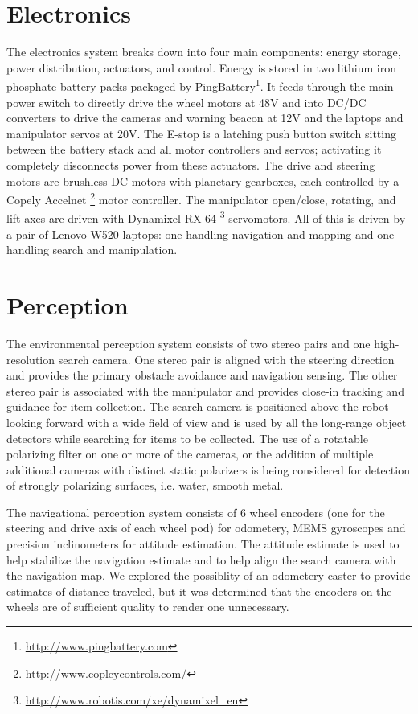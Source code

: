 \documentclass[12pt]{article}
\begin{document}
\section{Electronics}\label{Electronics}

The electronics system breaks down into four main components: energy storage, power distribution, actuators, and control. Energy is stored in two lithium iron phosphate battery packs packaged by PingBattery\footnote{\url{http://www.pingbattery.com}}. It feeds through the main power switch to directly drive the wheel motors at 48V and into DC/DC converters to drive the cameras and warning beacon at 12V and the laptops and manipulator servos at 20V. The E-stop is a latching push button switch sitting between the battery stack and all motor controllers and servos; activating it completely disconnects power from these actuators. The drive and steering motors are brushless DC motors with planetary gearboxes, each controlled by a Copely Accelnet \footnote{\url{http://www.copleycontrols.com/}} motor controller. The manipulator open/close, rotating, and lift axes are driven with Dynamixel RX-64 \footnote{\url{http://www.robotis.com/xe/dynamixel_en}} servomotors. All of this is driven by a pair of Lenovo W520 laptops: one handling navigation and mapping and one handling search and manipulation.

\section{Perception}\label{Perception}
The environmental perception system consists of two stereo pairs and one high-resolution search camera. One stereo pair is aligned with the steering direction and provides the primary obstacle avoidance and navigation sensing. The other stereo pair is associated with the manipulator and provides close-in tracking and guidance for item collection. The search camera is positioned above the robot looking forward with a wide field of view and is used by all the long-range object detectors while searching for items to be collected. The use of a rotatable polarizing filter on one or more of the cameras, or the addition of multiple additional cameras with distinct static polarizers is being considered for detection of strongly polarizing surfaces, i.e. water, smooth metal.

The navigational perception system consists of 6 wheel encoders (one for the steering and drive axis of each wheel pod) for odometery, MEMS gyroscopes and precision inclinometers for attitude estimation. The attitude estimate is used to help stabilize the navigation estimate and to help align the search camera with the navigation map. We explored the possiblity of an odometery caster to provide estimates of distance traveled, but it was determined that the encoders on the wheels are of sufficient quality to render one unnecessary.
\end{document}
